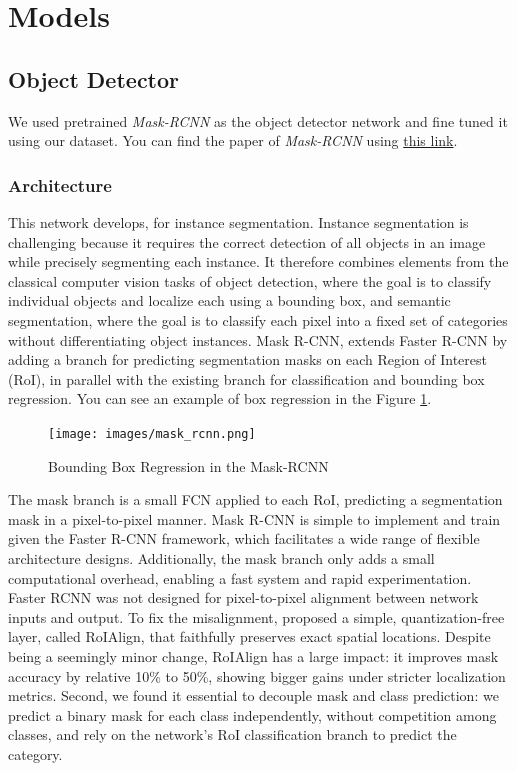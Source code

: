 \documentclass[a4paper, openany]{book}
\begin{document}
	
\section{Models}
	\vspace{0.3cm}
\subsection{Object Detector}
	\vspace{0.3cm}

We used pretrained \textit{Mask-RCNN} as the object detector network and fine tuned it using our dataset. You can find the paper of \textit{Mask-RCNN} using \href{https://arxiv.org/pdf/1703.06870.pdf}{this link}.

\subsubsection{Architecture}

This network develops, for instance segmentation. Instance segmentation is challenging because it requires the correct detection of all objects in an image while precisely segmenting each instance. It therefore combines elements from the classical computer vision tasks of object detection, where the goal is to classify individual objects and localize each using a bounding box, and semantic segmentation, where the goal is to classify each pixel into a fixed set of categories without differentiating object instances.
Mask R-CNN, extends Faster R-CNN by adding a branch for predicting segmentation masks on each Region of Interest (RoI), in parallel with the existing branch for classification and bounding box regression. You can see an example of box regression in the Figure \ref{fig:mask-rcnn}.


\begin{figure}[ht]
  \centering
    \texttt{[image: images/mask\_rcnn.png]}
      \caption{Bounding Box Regression in the Mask-RCNN}
  \label{fig:mask-rcnn}
\end{figure}

The mask branch is a small FCN applied to each RoI, predicting a segmentation mask in a pixel-to-pixel manner. Mask R-CNN is simple to implement and train given the Faster R-CNN framework, which facilitates a wide range of flexible architecture designs. Additionally, the mask branch only adds a small computational overhead, enabling a fast system and rapid experimentation. Faster RCNN was not designed for pixel-to-pixel alignment between network inputs and output. 
To fix the misalignment, proposed a simple, quantization-free layer, called RoIAlign, that faithfully preserves exact spatial locations. Despite being a seemingly minor change, RoIAlign has a large impact: it improves mask accuracy by relative 10\% to 50\%, showing bigger gains under stricter localization metrics. Second, we found it essential to decouple mask and class prediction: we predict a binary mask for each class independently, without competition among classes, and rely on the network’s RoI classification branch to predict the category. 
\end{document}
